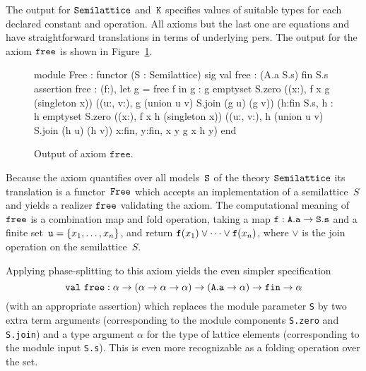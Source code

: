 The output for $\mathtt{Semilattice}$ and~$\mathtt{K}$ specifies
values of suitable types for each declared constant and operation. All
axioms but the last one are equations and have straightforward
translations in terms of underlying pers. The output for the axiom
$\mathtt{free}$ is shown in Figure~\ref{fig:free}.
%
\begin{figure}
  \centering
\begin{source}
module Free : functor (S : Semilattice) \iTo
sig
  val free : (A.a \iTo S.s) \iTo fin \iTo S.s
  assertion free :
    \iForall (f:), let g = free f in
      g :  \iAnd g emptyset  S.zero \iAnd 
      (\iForall (x:),  f x  g (singleton x)) \iAnd 
      (\iForall (u:, v:), g (union u v)  S.join (g u) (g v)) \iAnd 
      (\iForall h:fin \iTo S.s,  h :  \iAnd h emptyset  S.zero \iAnd 
         (\iForall (x:), f x  h (singleton x)) \iAnd 
         (\iForall (u:, v:), h (union u v)  S.join (h u) (h v)) \iTo
         \iForall x:fin, y:fin,  x  y \iTo g x  h y)
end
\end{source}
  \caption{Output of axiom $\texttt{free}$.}
  \label{fig:free}
\end{figure}
%
Because the axiom quantifies over all models~$\mathtt{S}$ of the theory
$\mathtt{Semilattice}$ its translation is a functor~$\mathtt{Free}$ which
accepts an implementation of a semilattice~$S$ and yields a realizer
$\mathtt{free}$ validating the axiom. The computational meaning of
$\mathtt{free}$ is a combination map and fold operation, taking a map
$\mathtt{f} : \mathtt{A.a} \to \mathtt{S.s}$ and a finite set~$\mathtt{u} = \{x_1,
  \ldots, x_n\}$, and return $\mathtt{f}(x_1) \vee \cdots \vee \mathtt{f}(x_n)$,
where $\vee$ is the join operation on the semilattice~$S$.

Applying phase-splitting to this axiom yields the even simpler
specification
%
\begin{equation*}
\mathtt{val}\ \mathtt{free} : \alpha \to (\alpha \to \alpha \to \alpha) \to (\mathtt{A.a}\to\alpha) \to \mathtt{fin} \to \alpha	
\end{equation*}
%
(with an appropriate assertion)
which replaces the module parameter \texttt{S} by two extra term arguments (corresponding to the module components \texttt{S.zero} and \texttt{S.join}) 
and a type argument $\alpha$ for the type of lattice elements (corresponding to the module input \texttt{S.s}).  This is even
more recognizable as a folding operation over the set.


